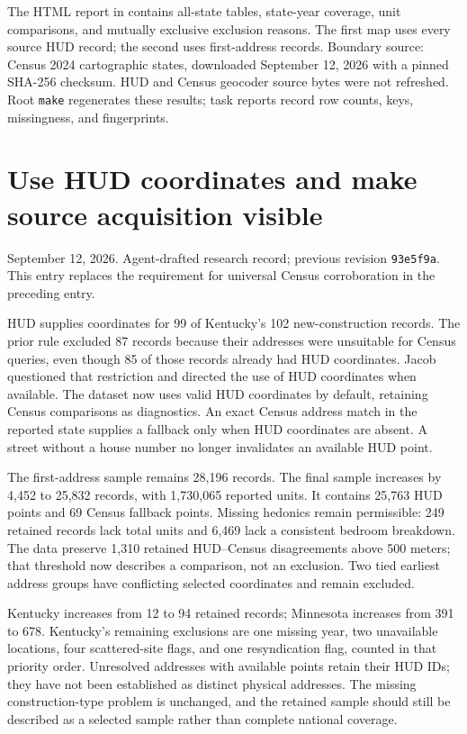 \documentclass[11pt]{article}
\begin{document}
\small
The HTML report in 
contains all-state tables, state-year coverage, unit comparisons, and mutually
exclusive exclusion reasons. The first map uses every source HUD record; the
second uses first-address records. Boundary source: Census 2024 cartographic
states, downloaded September 12, 2026 with a pinned SHA-256 checksum. HUD and
Census geocoder source bytes were not refreshed. Root \texttt{make} regenerates
these results; task reports record row counts, keys, missingness, and fingerprints.
\clearpage
\normalsize
\section*{Use HUD coordinates and make source acquisition visible}
\noindent September 12, 2026. Agent-drafted research record; previous revision
\texttt{93e5f9a}. This entry replaces the requirement for universal Census
corroboration in the preceding entry.

HUD supplies coordinates for 99 of Kentucky's 102 new-construction records.
The prior rule excluded 87 records because their addresses were unsuitable for
Census queries, even though 85 of those records already had HUD coordinates.
Jacob questioned that restriction and directed the use of HUD coordinates when
available. The dataset now uses valid HUD coordinates by default, retaining
Census comparisons as diagnostics. An exact Census address match in the reported
state supplies a fallback only when HUD coordinates are absent. A street without
a house number no longer invalidates an available HUD point.

\begin{center}\small

\end{center}

The first-address sample remains 28,196 records. The final sample increases by
4,452 to 25,832 records, with 1,730,065 reported units. It contains 25,763 HUD
points and 69 Census fallback points. Missing hedonics remain permissible: 249
retained records lack total units and 6,469 lack a consistent bedroom breakdown.
The data preserve 1,310 retained HUD--Census disagreements above 500 meters;
that threshold now describes a comparison, not an exclusion. Two tied earliest
address groups have conflicting selected coordinates and remain excluded.

Kentucky increases from 12 to 94 retained records; Minnesota increases from 391
to 678. Kentucky's remaining exclusions are one missing year, two unavailable
locations, four scattered-site flags, and one resyndication flag, counted in
that priority order. Unresolved addresses with available points retain their
HUD IDs; they have not been established as distinct physical addresses. The
missing construction-type problem is unchanged, and the retained sample should
still be described as a selected sample rather than complete national coverage.
\end{document}
